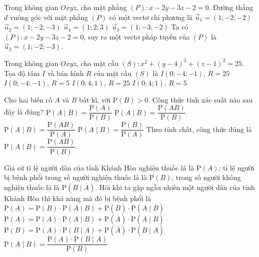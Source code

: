 \begin{ex}%
Trong không gian $Oxyz$, cho mặt phẳng $(P)\colon x-2y-3z-2=0$. Đường thẳng $d$ vuông góc với mặt phẳng $(P)$ có một vectơ chỉ phương là
\choice
{$\overrightarrow{u}_{1}=(1;-2;-2)$}
{\True $\overrightarrow{u}_{2}=(1;-2;-3)$}
{$\overrightarrow{u}_{4}=(1;2;3)$}
{$\overrightarrow{u}_{3}=(1;-3;-2)$}
\loigiai
{
Ta có $(P)\colon x-2y-3z-2=0$, suy ra một vectơ pháp tuyến của $(P)$ là $\overrightarrow{u}_{2}=(1;-2;-3)$.
}
\end{ex}

\begin{ex}%
Trong không gian $Oxyz$, cho mặt cầu $(S)\colon x^2+(y-4)^2+(z-1)^2=25$. Tọa độ tâm $I$ và bán kính $R$ của mặt cầu $(S)$ là
\choice
{$I(0;-4;-1)$, $R=25$}
{$I(0;-4;-1)$, $R=5$}
{$I(0;4;1)$, $R=25$}
{\True $I(0;4;1)$, $R=5$}
\end{ex}

\begin{ex}%
Cho hai biến cố $A$ và $B$ bất kì, với $\mathrm{P}(B)>0$. Công thức tính xác suất nào sau đây là đúng?
\choice
{$\mathrm{P}(A\mid B)= \dfrac{\mathrm{P}(A)}{\mathrm{P}(B)}$}
{\True $\mathrm{P}(A\mid B)= \dfrac{\mathrm{P}(AB)}{\mathrm{P}(B)}$}
{$\mathrm{P}(A\mid B)= \dfrac{\mathrm{P}(AB)}{\mathrm{P}(A)}$}
{$\mathrm{P}(A\mid B)= \dfrac{\mathrm{P}(B)}{\mathrm{P}(A)}$}
\loigiai
{
Theo tính chất, công thức đúng là $\mathrm{P}(A\mid B)= \dfrac{\mathrm{P}(AB)}{\mathrm{P}(B)}$.
}
\end{ex}

\begin{ex}%
Giả sử tỉ lệ người dân của tỉnh Khánh Hòa nghiện thuốc lá là $\mathrm{P}(A)$; tỉ lệ người bị bệnh phổi
trong số người nghiện thuốc lá là $\mathrm{P}(B)$, trong số người không nghiện thuốc lá là $\mathrm{P}(B\mid \overline{A})$. Hỏi khi ta gặp ngẫu nhiên một người dân của tỉnh Khánh Hòa thì khả năng mà đó bị bệnh phổi là
\choice
{$\mathrm{P}(A)=\mathrm{P}(B)\cdot\mathrm{P}(A\mid B)+\mathrm{P}(\overline{B})\cdot\mathrm{P}(A\mid \overline{B})$}
{$\mathrm{P}(A)=\mathrm{P}(A)\cdot\mathrm{P}(A\mid B)+\mathrm{P}(\overline{A})\cdot\mathrm{P}(A\mid \overline{B})$}
{\True $\mathrm{P}(B)=\mathrm{P}(A)\cdot\mathrm{P}(B\mid A)+\mathrm{P}(\overline{A})\cdot\mathrm{P}(B\mid \overline{A})$}
{$\mathrm{P}(A\mid B)=\dfrac{\mathrm{P}(A)\cdot\mathrm{P}(B\mid A)}{\mathrm{P}(B)}$}
\end{ex}

